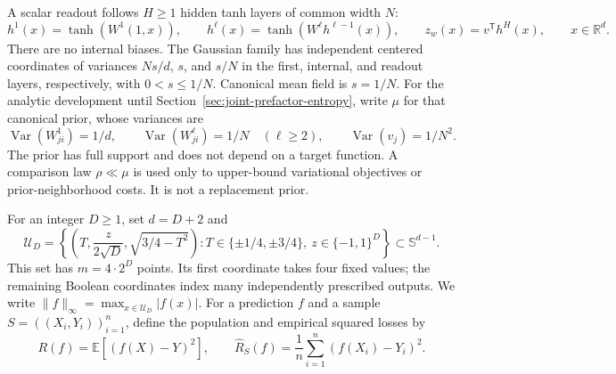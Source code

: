 \documentclass[11pt]{article}
\newcommand{\E}{\mathbb E}\newcommand{\R}{\mathbb R}\newcommand{\KL}{\operatorname{KL}}
\begin{document}
A scalar readout follows $H\ge1$ hidden tanh layers of common width $N$:
\[
 h^1(x)=\tanh(W^1(1,x)),\qquad
 h^\ell(x)=\tanh(W^\ell h^{\ell-1}(x)),\qquad
 z_w(x)=v^{\mathsf T}h^H(x),\qquad x\in\R^d.
\]
There are no internal biases. The Gaussian family has independent centered coordinates of variances $Ns/d$, $s$, and $s/N$ in the first, internal, and readout layers, respectively, with $0<s\le1/N$. Canonical mean field is $s=1/N$. For the analytic development until Section~\ref{sec:joint-prefactor-entropy}, write $\mu$ for that canonical prior, whose variances are
\begin{equation}
 \operatorname{Var}(W^1_{ji})=1/d,\qquad
 \operatorname{Var}(W^\ell_{ji})=1/N\quad(\ell\ge2),\qquad
 \operatorname{Var}(v_j)=1/N^2.
 \label{eq:canonical-prior}
\end{equation}
The prior has full support and does not depend on a target function. A comparison law $\rho\ll\mu$ is used only to upper-bound variational objectives or prior-neighborhood costs. It is not a replacement prior.

For an integer $D\ge1$, set $d=D+2$ and
\begin{equation}
 \mathcal U_D=\left\{\left(T,\frac z{2\sqrt D},\sqrt{3/4-T^2}\right):
 T\in\{\pm1/4,\pm3/4\},\ z\in\{-1,1\}^D\right\}
 \subset\mathbb S^{d-1}.
 \label{eq:unit-input-set}
\end{equation}
This set has $m=4\cdot2^D$ points. Its first coordinate takes four fixed values; the remaining Boolean coordinates index many independently prescribed outputs. We write $\|f\|_\infty=\max_{x\in\mathcal U_D}|f(x)|$.
For a prediction $f$ and a sample $S=((X_i,Y_i))_{i=1}^n$, define the population and empirical squared losses by
\[
 R(f)=\E[(f(X)-Y)^2],\qquad
 \widehat R_S(f)=\frac1n\sum_{i=1}^n(f(X_i)-Y_i)^2.
\]
\end{document}
